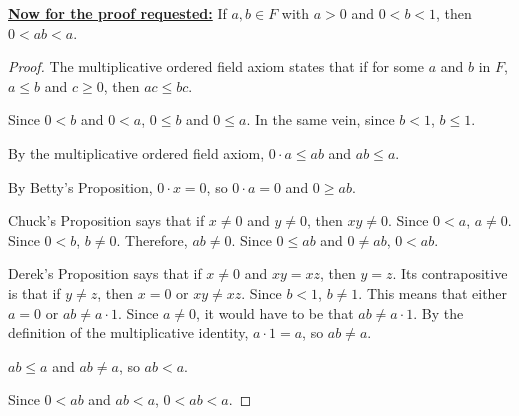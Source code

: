 \documentclass[11pt]{article}
\begin{document}
    \textbf{\underline{Now for the proof requested:}} If $a, b \in F$ with $a > 0$ and $0 < b < 1$, then $0 < ab < a$.
    \begin{proof}
        The multiplicative ordered field axiom states that if for some $a$ and $b$ in $F$, $a \leq b$ and $c \geq 0$, then $ac \leq bc$.
        
        Since $0 < b$ and $0 < a$, $0 \leq b$ and $0 \leq a$.
        In the same vein, since $b < 1$, $b \leq 1$.
        
        By the multiplicative ordered field axiom, $0 \cdot a \leq ab$ and $ab \leq a$.
        
        By Betty's Proposition, $0 \cdot x = 0$, so $0 \cdot a = 0$ and $0 \geq ab$.

        Chuck's Proposition says that if $x \neq 0$ and $y \neq 0$, then $xy \neq 0$.
        Since $0 < a$, $a \neq 0$.
        Since $0 < b$, $b \neq 0$.
        Therefore, $ab \neq 0$.
        Since $0 \leq ab$ and $0 \neq ab$, $0 < ab$.

        Derek's Proposition says that if $x \neq 0$ and $xy = xz$, then $y = z$.
        Its contrapositive is that if $y \neq z$, then $x = 0$ or $xy \neq xz$.
        Since $b < 1$, $b \neq 1$.
        This means that either $a = 0$ or $ab \neq a \cdot 1$.
        Since $a \neq 0$, it would have to be that $ab \neq a \cdot 1$.
        By the definition of the multiplicative identity, $a \cdot 1 = a$, so $ab \neq a$.

        $ab \leq a$ and $ab \neq a$, so $ab < a$.

        Since $0 < ab$ and $ab < a$, $0 < ab < a$.
    \end{proof}
\end{document}
